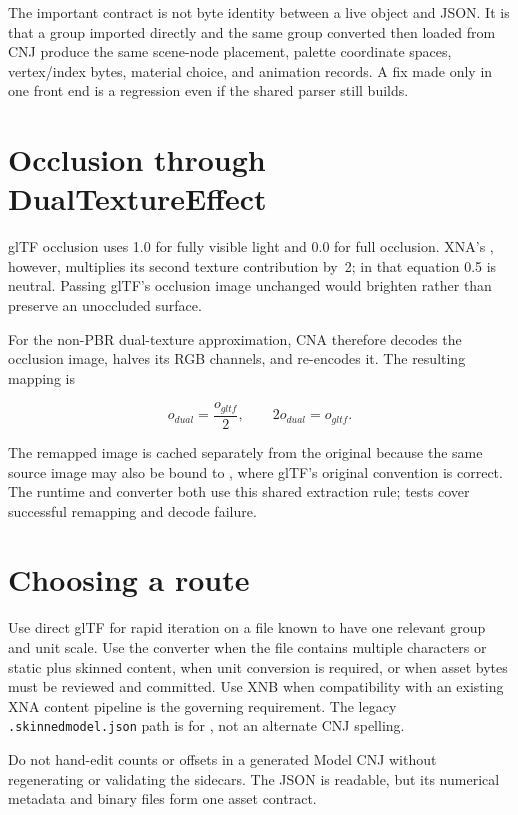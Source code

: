 The important contract is not byte identity between a live object and JSON. It is that a group
imported directly and the same group converted then loaded from CNJ produce the same scene-node
placement, palette coordinate spaces, vertex/index bytes, material choice, and animation
records. A fix made only in one front end is a regression even if the shared parser still
builds.

\section{Occlusion through DualTextureEffect}

glTF occlusion uses 1.0 for fully visible light and 0.0 for full occlusion. XNA's
, however, multiplies its second texture contribution by~2; in that
equation 0.5 is neutral. Passing glTF's occlusion image unchanged would brighten rather than
preserve an unoccluded surface.

For the non-PBR dual-texture approximation, CNA therefore decodes the occlusion image, halves
its RGB channels, and re-encodes it. The resulting mapping is

\[
  o_{dual} = \frac{o_{gltf}}{2},
  \qquad 2o_{dual}=o_{gltf}.
\]

The remapped image is cached separately from the original because the same source image may
also be bound to , where glTF's original convention is correct. The runtime
and converter both use this shared extraction rule; tests cover successful remapping and decode
failure.

\section{Choosing a route}

Use direct glTF for rapid iteration on a file known to have one relevant group and unit scale.
Use the converter when the file contains multiple characters or static plus skinned content,
when unit conversion is required, or when asset bytes must be reviewed and committed. Use XNB
when compatibility with an existing XNA content pipeline is the governing requirement. The
legacy \texttt{.skinnedmodel.json} path is for , not an alternate CNJ
spelling.

Do not hand-edit counts or offsets in a generated Model CNJ without regenerating or validating
the sidecars. The JSON is readable, but its numerical metadata and binary files form one asset
contract.
